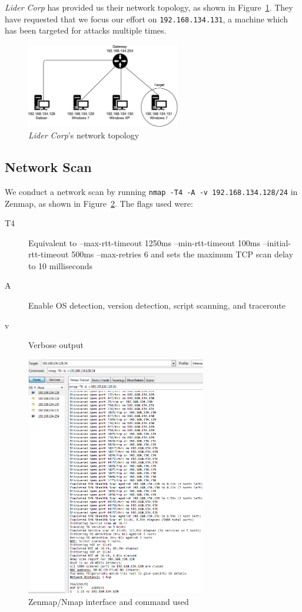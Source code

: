 \documentclass{article}[12 pt,a4paper]
\begin{document}
\emph{Lider Corp} has provided us their network topology, as shown in Figure~\ref{network_diag}. They have requested that we focus our effort on \texttt{192.168.134.131}, a machine which has been targeted for attacks multiple times.

\begin{figure}
\centering
\includegraphics[width=0.6\textwidth]{scan/network_diag}
\caption{\emph{Lider Corp}'s network topology}
\label{network_diag}
\end{figure}

\subsection{Network Scan}
 
We conduct a network scan by running \texttt{nmap -T4 -A -v 192.168.134.128/24} in Zenmap, as shown in Figure~\ref{nmap_command}. The flags used were:
\begin{description}
\item[T4] Equivalent to --max-rtt-timeout 1250ms --min-rtt-timeout 100ms --initial-rtt-timeout 500ms --max-retries 6 and sets the maximum TCP scan delay to 10 milliseconds
\item[A] Enable OS detection, version detection, script scanning, and traceroute
\item[v] Verbose output
\end{description}

\begin{figure}
\centering
\includegraphics[width=0.7\textwidth]{scan/nmap_6}
\caption{Zenmap/Nmap interface and command used}
\label{nmap_command}
\end{figure}
\end{document}
